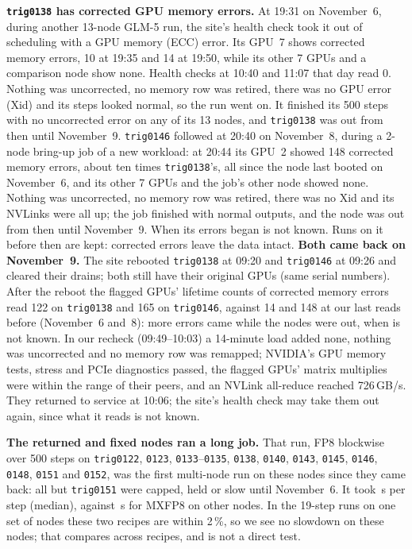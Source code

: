 \textbf{\texttt{trig0138} has corrected GPU memory errors.} At 19:31 on November~6, during another 13-node GLM-5 run, the site's health check took it out of scheduling with a GPU memory (ECC) error. Its GPU~7 shows corrected memory errors, 10 at 19:35 and 14 at 19:50, while its other 7 GPUs and a comparison node show none. Health checks at 10:40 and 11:07 that day read 0. Nothing was uncorrected, no memory row was retired, there was no GPU error (Xid) and its steps looked normal, so the run went on. It finished its 500 steps with no uncorrected error on any of its 13 nodes, and \texttt{trig0138} was out from then until November~9. \texttt{trig0146} followed at 20:40 on November~8, during a 2-node bring-up job of a new workload: at 20:44 its GPU~2 showed 148 corrected memory errors, about ten times \texttt{trig0138}'s, all since the node last booted on November~6, and its other 7 GPUs and the job's other node showed none. Nothing was uncorrected, no memory row was retired, there was no Xid and its NVLinks were all up; the job finished with normal outputs, and the node was out from then until November~9. When its errors began is not known. Runs on it before then are kept: corrected errors leave the data intact. \textbf{Both came back on November~9.} The site rebooted \texttt{trig0138} at 09:20 and \texttt{trig0146} at 09:26 and cleared their drains; both still have their original GPUs (same serial numbers). After the reboot the flagged GPUs' lifetime counts of corrected memory errors read 122 on \texttt{trig0138} and 165 on \texttt{trig0146}, against 14 and 148 at our last reads before (November~6 and~8): more errors came while the nodes were out, when is not known. In our recheck (09:49--10:03) a 14-minute load added none, nothing was uncorrected and no memory row was remapped; NVIDIA's GPU memory tests, stress and PCIe diagnostics passed, the flagged GPUs' matrix multiplies were within the range of their peers, and an NVLink all-reduce reached 726\,GB/s. They returned to service at 10:06; the site's health check may take them out again, since what it reads is not known.

\textbf{The returned and fixed nodes ran a long job.} That run, FP8 blockwise over 500 steps on \texttt{trig0122}, \texttt{0123}, \texttt{0133}--\texttt{0135}, \texttt{0138}, \texttt{0140}, \texttt{0143}, \texttt{0145}, \texttt{0146}, \texttt{0148}, \texttt{0151} and \texttt{0152}, was the first multi-node run on these nodes since they came back: all but \texttt{trig0151} were capped, held or slow until November~6. It took \TriGlmLongBlockStep\,s per step (median), against \TriGlmLongStepMx\,s for MXFP8 on other nodes. In the 19-step runs on one set of nodes these two recipes are within 2\,\%, so we see no slowdown on these nodes; that compares across recipes, and is not a direct test.

